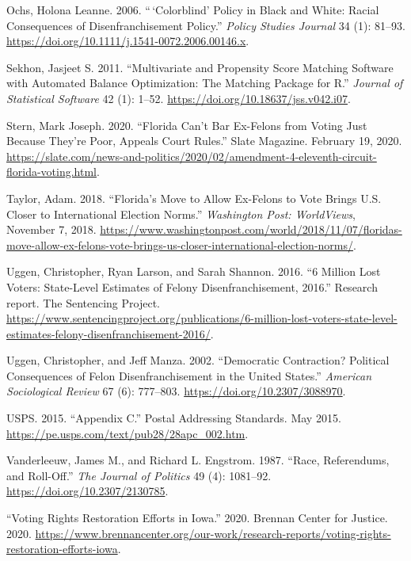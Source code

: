 \documentclass[
  12pt,
]{article}
\newlength{\cslhangindent}
\newenvironment{cslreferences}%
  {\setlength{\parindent}{0pt}%
  \everypar{\setlength{\hangindent}{\cslhangindent}}\ignorespaces}%
  {\par}
\begin{document}
\begin{cslreferences}
\leavevmode\hypertarget{ref-Ochs2006}{}%
Ochs, Holona Leanne. 2006. ``\,`Colorblind' Policy in Black and White: Racial Consequences of Disenfranchisement Policy.'' \emph{Policy Studies Journal} 34 (1): 81--93. \url{https://doi.org/10.1111/j.1541-0072.2006.00146.x}.

\leavevmode\hypertarget{ref-Sekhon2011}{}%
Sekhon, Jasjeet S. 2011. ``Multivariate and Propensity Score Matching Software with Automated Balance Optimization: The Matching Package for R.'' \emph{Journal of Statistical Software} 42 (1): 1--52. \url{https://doi.org/10.18637/jss.v042.i07}.

\leavevmode\hypertarget{ref-Stern2020}{}%
Stern, Mark Joseph. 2020. ``Florida Can't Bar Ex-Felons from Voting Just Because They're Poor, Appeals Court Rules.'' Slate Magazine. February 19, 2020. \url{https://slate.com/news-and-politics/2020/02/amendment-4-eleventh-circuit-florida-voting.html}.

\leavevmode\hypertarget{ref-Taylor2018}{}%
Taylor, Adam. 2018. ``Florida's Move to Allow Ex-Felons to Vote Brings U.S. Closer to International Election Norms.'' \emph{Washington Post: WorldViews}, November 7, 2018. \url{https://www.washingtonpost.com/world/2018/11/07/floridas-move-allow-ex-felons-vote-brings-us-closer-international-election-norms/}.

\leavevmode\hypertarget{ref-sentencing_2016}{}%
Uggen, Christopher, Ryan Larson, and Sarah Shannon. 2016. ``6 Million Lost Voters: State-Level Estimates of Felony Disenfranchisement, 2016.'' Research report. The Sentencing Project. \url{https://www.sentencingproject.org/publications/6-million-lost-voters-state-level-estimates-felony-disenfranchisement-2016/}.

\leavevmode\hypertarget{ref-Uggen2002}{}%
Uggen, Christopher, and Jeff Manza. 2002. ``Democratic Contraction? Political Consequences of Felon Disenfranchisement in the United States.'' \emph{American Sociological Review} 67 (6): 777--803. \url{https://doi.org/10.2307/3088970}.

\leavevmode\hypertarget{ref-USPS2015}{}%
USPS. 2015. ``Appendix C.'' Postal Addressing Standards. May 2015. \url{https://pe.usps.com/text/pub28/28apc_002.htm}.

\leavevmode\hypertarget{ref-Vanderleeuw1987}{}%
Vanderleeuw, James M., and Richard L. Engstrom. 1987. ``Race, Referendums, and Roll-Off.'' \emph{The Journal of Politics} 49 (4): 1081--92. \url{https://doi.org/10.2307/2130785}.

\leavevmode\hypertarget{ref-bcj_iowa}{}%
``Voting Rights Restoration Efforts in Iowa.'' 2020. Brennan Center for Justice. 2020. \url{https://www.brennancenter.org/our-work/research-reports/voting-rights-restoration-efforts-iowa}.


\end{cslreferences}
\end{document}
